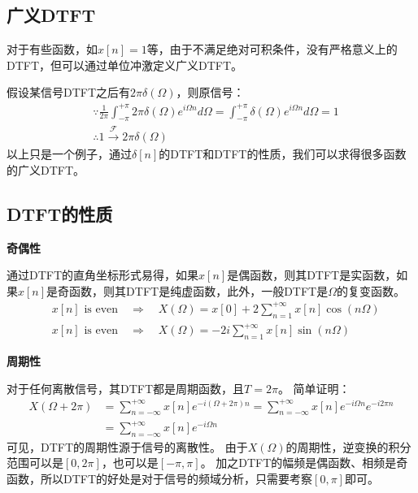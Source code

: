 \subsection{广义DTFT}

对于有些函数，如$x\left[ n \right] =1$等，由于不满足绝对可积条件，没有严格意义上的DTFT，但可以通过单位冲激定义广义DTFT。

假设某信号DTFT之后有$2\pi \delta \left( \varOmega \right) $，则原信号：
\begin{align*}
&\because \frac{1}{2\pi}\int_{-\pi}^{+\pi}{2\pi \delta \left( \varOmega \right) e^{i\varOmega n}d\varOmega}=\int_{-\pi}^{+\pi}{\delta \left( \varOmega \right) e^{i\varOmega n}d\varOmega}=1 \\
&\therefore 1\overset{\mathscr{F}}{\rightarrow}2\pi \delta \left( \varOmega \right)
\end{align*}
以上只是一个例子，通过$\delta \left[ n \right] $的DTFT和DTFT的性质，我们可以求得很多函数的广义DTFT。

\subsection{DTFT的性质}

{\bf 奇偶性}

通过DTFT的直角坐标形式易得，如果$x\left[ n \right] $是偶函数，则其DTFT是实函数，如果$x\left[ n \right] $是奇函数，则其DTFT是纯虚函数，此外，一般DTFT是$\varOmega $的复变函数。
\begin{align*}
&x\left[ n \right] \text{ is even} \quad \Rightarrow \quad X\left( \varOmega \right) =x\left[ 0 \right] +2\sum_{n=1}^{+\infty}{x\left[ n \right] \cos \left( n\varOmega \right)} \\
&x\left[ n \right] \text{ is even} \quad \Rightarrow \quad X\left( \varOmega \right) =-2i\sum_{n=1}^{+\infty}{x\left[ n \right] \sin \left( n\varOmega \right)}
\end{align*}

{\bf 周期性}

对于任何离散信号，其DTFT都是周期函数，且$T=2\pi $。
简单证明：
\begin{align*}
X\left( \varOmega +2\pi \right) &=\sum_{n=-\infty}^{+\infty}{x\left[ n \right] e^{-i\left( \varOmega +2\pi \right) n}}=\sum_{n=-\infty}^{+\infty}{x\left[ n \right] e^{-i\varOmega n}e^{-i2\pi n}} \\
&=\sum_{n=-\infty}^{+\infty}{x\left[ n \right] e^{-i\varOmega n}}
\end{align*}
可见，DTFT的周期性源于信号的离散性。
由于$X\left( \varOmega \right) $的周期性，逆变换的积分范围可以是$\left[ 0,2\pi \right] $，也可以是$\left[ -\pi ,\pi \right] $。
加之DTFT的幅频是偶函数、相频是奇函数，所以DTFT的好处是对于信号的频域分析，只需要考察$\left[ 0,\pi \right] $即可。

